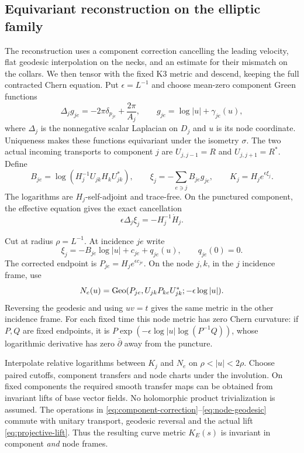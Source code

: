 \subsection{Equivariant reconstruction on the elliptic family}
The reconstruction uses a component correction cancelling the leading
velocity, flat geodesic interpolation on the necks, and an estimate
for their mismatch on the collars. We then tensor with the fixed
K3 metric and descend, keeping the full contracted Chern equation.
Put $\epsilon=L^{-1}$ and choose mean-zero component Green functions
\begin{equation}\label{eq:greens}
 \Delta_jg_{je}=-2\pi\delta_{p_{je}}+\frac{2\pi}{A_j},\qquad
 g_{je}=\log|u|+\gamma_{je}(u),
\end{equation}
where $\Delta_j$ is the nonnegative scalar Laplacian on $D_j$ and
$u$ is its node coordinate. Uniqueness makes these functions equivariant
under the isometry $\sigma$. The two actual incoming transports to
component $j$ are $U_{j,j-1}=R$ and $U_{j,j+1}=R^*$.
Define
\begin{equation}\label{eq:component-correction}
 B_{je}=\log(H_j^{-1}U_{jk}H_kU_{jk}^*),\qquad
 \xi_j=-\sum_{e\ni j}B_{je}g_{je},\qquad K_j=H_j e^{\epsilon\xi_j}.
\end{equation}
The logarithms are $H_j$-self-adjoint and trace-free. On the punctured
component, the effective equation gives the exact cancellation
\begin{equation}\label{eq:component-cancellation}
 \epsilon\Delta_j\xi_j=-H_j^{-1}\dot H_j.
\end{equation}

Cut at radius $\rho=L^{-1}$. At incidence $je$ write
\[
 \xi_j=-B_{je}\log|u|+c_{je}+q_{je}(u),\qquad q_{je}(0)=0.
\]
The corrected endpoint is $P_{je}=H_je^{\epsilon c_{je}}$.
On the node $j,k$, in the $j$ incidence frame, use
\begin{equation}\label{eq:node-geodesic}
 N_e(u)=\operatorname{Geo}(P_{je},U_{jk}P_{ke}U_{jk}^*;-\epsilon\log|u|).
\end{equation}
Reversing the geodesic and using $uv=t$ gives the same metric in the
other incidence frame. For each fixed time this node metric has zero
Chern curvature: if $P,Q$ are fixed endpoints, it is
$P\exp(-\epsilon\log|u|\log(P^{-1}Q))$, whose logarithmic derivative
has zero $\bar\partial$ away from the puncture.

Interpolate relative logarithms between $K_j$ and $N_e$ on
$\rho<|u|<2\rho$. Choose paired cutoffs, component transfers and node
charts under the involution. On fixed components the required smooth
transfer maps can be obtained from invariant lifts of base vector fields.
No holomorphic product trivialization is assumed. The operations
in \eqref{eq:component-correction}--\eqref{eq:node-geodesic} commute
with unitary transport, geodesic reversal and the actual lift
\eqref{eq:projective-lift}. Thus the resulting curve metric $K_E(s)$
is invariant in component \emph{and} node frames.

